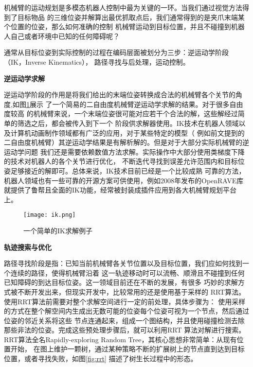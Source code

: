 机械臂的运动规划是多模态机器人控制中最为关键的一环。当我们通过视觉方法得到了目标物品
的三维位姿并解算出最优抓取点后，我们通常得到的是夹爪末端某个位置的位姿，那么如何准确的控制
机械臂运动到目标位置，并且不碰撞到机器人自己或者环境中已知的任何障碍呢？

通常从目标位姿到实际控制的过程在编码层面被划分为三步：逆运动学阶段（IK，Inverse Kinematics），
路径寻找与后处理，运动控制。

\noindent \textbf{逆运动学求解}

逆运动学阶段的作用是将我们给出的末端位姿转换成合法的机械臂各个关节的角度,如图\ref{fig:ik}展示
了一个简易的二自由度机械臂逆运动学求解的结果。对于很多自由度较高
的机械臂来说，一个末端位姿很可能对应若干个合法的解，这些解经过简单的筛选之后，都会被传入到下一个
阶段供求解器使用。IK技术在机器人领域以及计算机动画制作领域都有广泛的应用，对于某些特定的模型（
例如前文提到的二自由度机械臂）其逆运动学结果是有解析解的。但是对于大部分实际机械臂的逆运动学问题
我们还是需要依赖数值方法求解。实际操作中大部分使用类梯度下降的技术对机器人的各个关节进行优化，
不断迭代寻找到误差允许范围内和目标位姿足够接近的解即可。总体来说，IK技术目前已经是一个比较成熟
可靠的方法，机器人领域也有一些可靠的开源方案可供使用，例如2008年发布的OpenRAVE库\cite{diankov2008openrave}
就提供了鲁帮且全面的IK功能，经常被封装成插件应用到各大机械臂规划平台上。

\begin{figure}[h] %
  \centering
  \texttt{[image: ik.png]}
  \caption{一个简单的IK求解例子}
  \label{fig:ik}
\end{figure}

\noindent \textbf{轨迹搜索与优化}

路径寻找阶段是指：已知当前机械臂各关节位置以及目标位置，我们应如何找到一个连续的路径，使得机械臂沿着
这一轨迹移动时可以流畅、顺滑且不碰撞到任何已知障碍的到达目标位姿。这一领域目前还在不断的发展，有很多
巧妙的求解方式被不断开发出来\cite{masehian2007classic}，但现实开发中，比较常用的还是使用基于采样的
RRT\cite{lavalle1998rapidly}算法。使用RRT算法前需要对整个求解空间进行一定的前处理，具体步骤为：
使用采样的方式在整个解空间内生成出无数可能的位姿每个位姿可视为一个节点，然后通过位姿的邻近关系将这些
节点连通起来，组成一个图结构，并且使用碰撞检测去除那些非法的位姿。完成这些预处理步骤后，就可以利用RRT
算法对解进行搜索。RRT算法全名Rapidly-exploring Random Tree，其核心思想非常简单：从现有位置开始，
在图上维护一颗树，通过某种策略不断的扩展树上的节点直到达到目标位置，或者寻找失败，如图\ref{fig:rrt}
描述了树生长过程中的形态。


